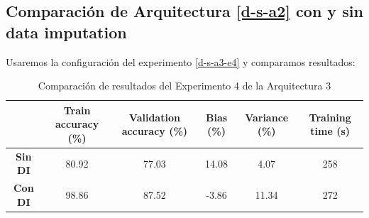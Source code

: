 \documentclass{article}
\begin{document}
			\subsection{Comparaci\'on de Arquitectura \ref{d-s-a2} con y sin data imputation}
		\label{d-s-dp-2}
			Usaremos la configuraci\'on del experimento \ref{d-s-a3-e4} y comparamos resultados:
			\begin{table}[!h]
				\begin{center}
					\begin{tabular}{ c | c | c | c | c | c |}
						\ & \textbf{Train accuracy (\%)} & \textbf{Validation accuracy (\%)} & \textbf{Bias (\%)} & \textbf{Variance (\%)} & \textbf{Training time (s)} \\ \hline
						\textbf{Sin DI} & 80.92 & 77.03 & 14.08 & 4.07 & 258\\ \hline
						\textbf{Con DI} & 98.86 & 87.52 & -3.86 & 11.34 & 272 \\ \hline
					\end{tabular}
					\caption{Comparaci\'on de resultados del Experimento 4 de la Arquitectura 3}
					\label{tab:res-d-a1-e2}
				\end{center}
			\end{table}
\end{document}

